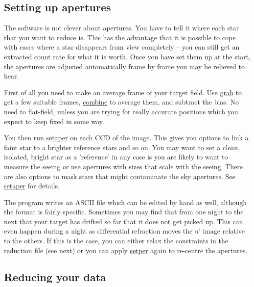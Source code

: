\documentclass[10pt,a4paper,twocolumn]{article}
\newcommand{\main}{http://quetzel.csc.warwick.ac.uk/phsaap/software}
\newcommand{\ultracam}{\main/ultracam/html}
\begin{document}
\subsection{Setting up apertures}

\label{sec:apertures}

The software is not clever about apertures. You have to tell it where
each star that you want to reduce is. This has the advantage that it
is possible to cope with cases where a star disappears from view completely
-- you can still get an extracted count rate for what it is worth. Once you
have set them up at the start, the apertures are adjusted automatically frame by
frame you may be relieved to hear.

First of all you need to make an average frame of your target field. Use
\href{\ultracam/grab.html}{grab} to get a few suitable frames,
\href{\ultracam/combine.html}{combine} to average them, and subtract the bias.
No need to flat-field, unless you are trying for really accurate positions which
you expect to keep fixed in some way.

You then run \href{\ultracam/setaper.html}{setaper} on each CCD of the image.
This gives you options to link a faint star to a brighter reference stars and
so on. You may want to set a clean, isolated, bright star as a 'reference' in
any case is you are likely to want to measure the seeing or use apertures with
sizes that scale with the seeing. There are also options to mask stars that
might contaminate the sky apertures. See \href{\ultracam/setaper.html}{setaper}
for details.

The program writes an ASCII file which can be edited by hand as well, although
the format is fairly specific. Sometimes you may find that from one
night to the next that your target has drifted so far that it does not
get picked up. This can even happen during a night as differential
refraction moves the u' image relative to the others. If this is the
case, you can either relax the constraints in the reduction file (see
next) or you can apply \href{\ultracam/setaper.html}{setper} again to
re-centre the apertures.

\subsection{Reducing your data}
\end{document}
